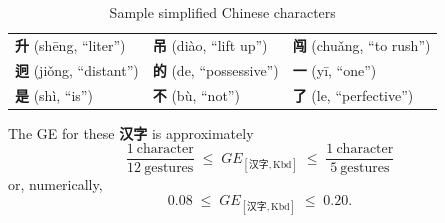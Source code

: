 \begin{table}[H]
	\centering
	\caption{Sample simplified Chinese characters}
	\label{tab:sample-simplified-chars}

	\begingroup
	\setlength{\tabcolsep}{1em}%
	\renewcommand{\arraystretch}{0.85}%

	\begin{singlespace*}%
		\small               %

		\begin{tabular}{lll}
			\textbf{升} (shēng, “liter”)     &
			\textbf{吊} (diào, “lift up”)   &
			\textbf{闯} (chuǎng, “to rush”) \\
			\textbf{迥} (jiǒng, “distant”)  &
			\textbf{的} (de, “possessive”)  &
			\textbf{一} (yī, “one”)         \\
			\textbf{是} (shì, “is”)         &
			\textbf{不} (bù, “not”)         &
			\textbf{了} (le, “perfective”)
		\end{tabular}

	\end{singlespace*}
	\endgroup
\end{table}

The GE for these \textbf{汉字} is approximately
\[
\frac{1\ \text{character}}{12\ \text{gestures}}
\;\leq\;
GE_{[\text{汉字},\text{Kbd}]}
\;\leq\;
\frac{1\ \text{character}}{5\ \text{gestures}}
\]
or, numerically,
\[
0.08 \;\leq\; GE_{[\text{汉字},\text{Kbd}]} \;\leq\; 0.20.
\]
